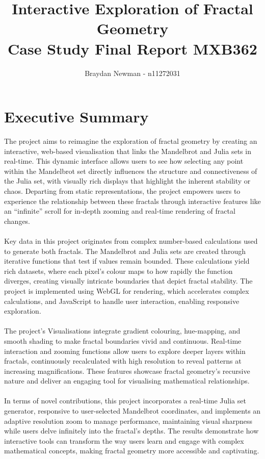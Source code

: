 \documentclass[12pt,a4paper]{report}
\author{Braydan Newman - n11272031}
\title{
	Interactive Exploration of Fractal Geometry \\
	\large Case Study Final Report MXB362
	\footnotetext{All Fractal images are generated using "https://fractals.braydannewman.com/", unless specified otherwise}
}
\begin{document}
\maketitle
\tableofcontents
\newpage

\section{Executive Summary}

The project aims to reimagine the exploration of fractal geometry by creating an interactive, web-based visualisation that links the Mandelbrot and Julia sets in real-time. This dynamic interface allows users to see how selecting any point within the Mandelbrot set directly influences the structure and connectiveness of the Julia set, with visually rich displays that highlight the inherent stability or chaos. Departing from static representations, the project empowers users to experience the relationship between these fractals through interactive features like an “infinite” scroll for in-depth zooming and real-time rendering of fractal changes.
\\\\
Key data in this project originates from complex number-based calculations used to generate both fractals. The Mandelbrot and Julia sets are created through iterative functions that test if values remain bounded. These calculations yield rich datasets, where each pixel’s colour maps to how rapidly the function diverges, creating visually intricate boundaries that depict fractal stability. The project is implemented using WebGL for rendering, which accelerates complex calculations, and JavaScript to handle user interaction, enabling responsive exploration. 
\\\\
The project's Visualisations integrate gradient colouring, hue-mapping, and smooth shading to make fractal boundaries vivid and continuous. Real-time interaction and zooming functions allow users to explore deeper layers within fractals, continuously recalculated with high resolution to reveal patterns at increasing magnifications. These features showcase fractal geometry’s recursive nature and deliver an engaging tool for visualising mathematical relationships. 
\\\\
In terms of novel contributions, this project incorporates a real-time Julia set generator, responsive to user-selected Mandelbrot coordinates, and implements an adaptive resolution zoom to manage performance, maintaining visual sharpness while users delve infinitely into the fractal’s depths. The results demonstrate how interactive tools can transform the way users learn and engage with complex mathematical concepts, making fractal geometry more accessible and captivating. 
\end{document}
